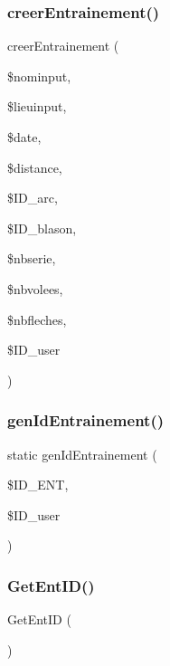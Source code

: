 \subsubsection{creer\+Entrainement()}
{\footnotesize\ttfamily creer\+Entrainement (\begin{DoxyParamCaption}\item[{}]{\$nominput,  }\item[{}]{\$lieuinput,  }\item[{}]{\$date,  }\item[{}]{\$distance,  }\item[{}]{\$\+I\+D\+\_\+arc,  }\item[{}]{\$\+I\+D\+\_\+blason,  }\item[{}]{\$nbserie,  }\item[{}]{\$nbvolees,  }\item[{}]{\$nbfleches,  }\item[{}]{\$\+I\+D\+\_\+user }\end{DoxyParamCaption})}

\mbox{\label{classentrainement_a7cff09e329476f9c8fb9cf9c4cb1ca8e}} 
\subsubsection{gen\+Id\+Entrainement()}
{\footnotesize\ttfamily static gen\+Id\+Entrainement (\begin{DoxyParamCaption}\item[{}]{\$\+I\+D\+\_\+\+E\+NT,  }\item[{}]{\$\+I\+D\+\_\+user }\end{DoxyParamCaption})\hspace{0.3cm}{\ttfamily [static]}}

\mbox{\label{classentrainement_aba3b5e9e9d366fe4b93b7e32c2f3b74f}} 
\subsubsection{Get\+Ent\+I\+D()}
{\footnotesize\ttfamily Get\+Ent\+ID (\begin{DoxyParamCaption}{ }\end{DoxyParamCaption})}

\mbox{\label{classentrainement_a4b0681cb05b5f7698173a309b80ec39c}} 
